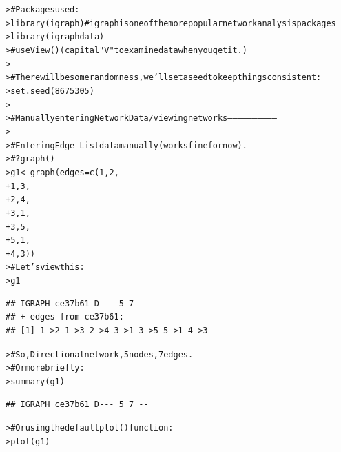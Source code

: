 \documentclass[12pt]{article}\usepackage[]{graphicx}\usepackage[]{color}
\makeatletter
\newcommand{\hlnum}[1]{\textcolor[rgb]{0.82,0.78,0.62}{#1}}%
\newcommand{\hlcom}[1]{\textcolor[rgb]{0.404,0.408,0.42}{#1}}%
\newcommand{\hlstd}[1]{\textcolor[rgb]{0.882,0.878,0.898}{#1}}%
\newcommand{\hlkwb}[1]{\textcolor[rgb]{0.902,0.675,0.196}{#1}}%
\newcommand{\hlkwc}[1]{\textcolor[rgb]{0.812,0.522,0.388}{#1}}%
\newcommand{\hlkwd}[1]{\textcolor[rgb]{0.733,0.388,0.812}{#1}}%
\newenvironment{kframe}{%
 \def\at@end@of@kframe{}%
 \ifinner\ifhmode%
  \def\at@end@of@kframe{\end{minipage}}%
  \begin{minipage}{\columnwidth}%
 \fi\fi%
 \def\FrameCommand##1{\hskip\@totalleftmargin \hskip-\fboxsep
 \colorbox{shadecolor}{##1}\hskip-\fboxsep
     \hskip-\linewidth \hskip-\@totalleftmargin \hskip\columnwidth}%
 \MakeFramed {\advance\hsize-\width
   \@totalleftmargin\z@ \linewidth\hsize
   \@setminipage}}%
 {\par\unskip\endMakeFramed%
 \at@end@of@kframe}
\newenvironment{knitrout}{}{} %
\makeatother
\begin{document}
\begin{flushleft}
\begin{center}
\begin{knitrout}
\color{fgcolor}\begin{kframe}
\begin{alltt}
\hlstd{> }\hlcom{# Packages used:}
\hlstd{> }\hlkwd{library}\hlstd{(igraph)} \hlcom{# igraph is one of the more popular network analysis packages}
\hlstd{> }\hlkwd{library}\hlstd{(igraphdata)}
\hlstd{> }\hlcom{# use  View() (capital "V" to examine data when you get it.)}
\hlstd{> }
\hlstd{> }\hlcom{# There will be some randomness, we'll set a seed to keep things consistent:}
\hlstd{> }\hlkwd{set.seed}\hlstd{(}\hlnum{8675305}\hlstd{)}
\hlstd{> }
\hlstd{> }\hlcom{# Manually entering Network Data/ viewing networks -----------------------------}
\hlstd{> }
\hlstd{> }\hlcom{# Entering Edge-List data manually (works fine for now).}
\hlstd{> }\hlcom{# ?graph()}
\hlstd{> }\hlstd{g1} \hlkwb{<-} \hlkwd{graph}\hlstd{(}\hlkwc{edges}\hlstd{=}\hlkwd{c}\hlstd{(}\hlnum{1}\hlstd{,}\hlnum{2}\hlstd{,}
\hlstd{+ }                    \hlnum{1}\hlstd{,}\hlnum{3}\hlstd{,}
\hlstd{+ }                    \hlnum{2}\hlstd{,}\hlnum{4}\hlstd{,}
\hlstd{+ }                    \hlnum{3}\hlstd{,}\hlnum{1}\hlstd{,}
\hlstd{+ }                    \hlnum{3}\hlstd{,}\hlnum{5}\hlstd{,}
\hlstd{+ }                    \hlnum{5}\hlstd{,}\hlnum{1}\hlstd{,}
\hlstd{+ }                    \hlnum{4}\hlstd{,}\hlnum{3}\hlstd{))}
\hlstd{> }\hlcom{# Let's view this:}
\hlstd{> }\hlstd{g1}
\end{alltt}
\begin{verbatim}
## IGRAPH ce37b61 D--- 5 7 -- 
## + edges from ce37b61:
## [1] 1->2 1->3 2->4 3->1 3->5 5->1 4->3
\end{verbatim}
\begin{alltt}
\hlstd{> }\hlcom{# So, Directional network, 5 nodes, 7 edges.}
\hlstd{> }\hlcom{# Or more briefly:}
\hlstd{> }\hlkwd{summary}\hlstd{(g1)}
\end{alltt}
\begin{verbatim}
## IGRAPH ce37b61 D--- 5 7 --
\end{verbatim}
\begin{alltt}
\hlstd{> }\hlcom{# Or using the default plot() function:}
\hlstd{> }\hlkwd{plot}\hlstd{(g1)}
\end{alltt}
\end{kframe}

\end{knitrout}
\end{center}
\end{flushleft}
\end{document}
